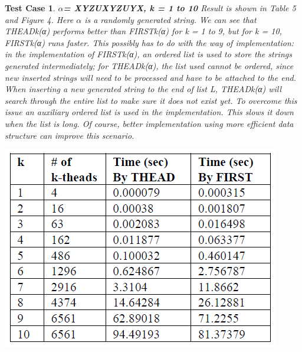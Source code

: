 \documentclass{sig-alternate-05-2015}
\newtheorem{TestCase}{Test Case}
\begin{document}
\begin{TestCase}
\textbf{$\alpha$= XYZUXYZUYX, k = 1 to 10}
Result is shown in Table 5 and Figure 4. Here $\alpha$ is a randomly
generated string. We can see that THEADk(α) performs
better than FIRSTk(α) for k = 1 to 9, but for k = 10,
FIRSTk(α) runs faster. This possibly has to do with the way
of implementation: in the implementation of FIRSTk(α), an
ordered list is used to store the strings generated intermediately;
for THEADk(α), the list used cannot be ordered,
since new inserted strings will need to be processed and
have to be attached to the end. When inserting a new generated
string to the end of list L, THEADk(α) will search
through the entire list to make sure it does not exist yet. To
overcome this issue an auxiliary ordered list is used in the
implementation. This slows it down when the list is long.
Of course, better implementation using more efficient data
structure can improve this scenario.

\begin{table}[h]
\centering
\includegraphics[scale=0.5]{table5.PNG}
\caption{Number of generated k-theads and time spent on
input string XYZUXYZUYX, for k = 1 to 10}
\label{table:5}
\end{table}


\end{TestCase}
\end{document}
